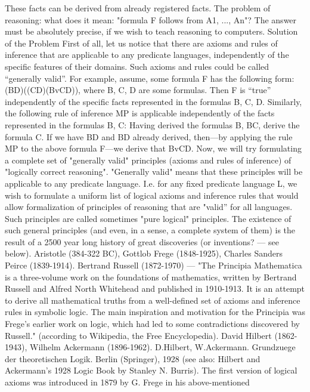 These facts can be derived from already registered facts.
The problem of reasoning: what does it mean: "formula F follows from A1, ..., An"? The answer must be
absolutely precise, if we wish to teach reasoning to computers.
Solution of the Problem
First of all, let us notice that there are axioms and rules of inference that are applicable to any predicate
languages, independently of the specific features of their domains. Such axioms and rules could be called
``generally valid''.
For example, assume, some formula F has the following form:
(B\IMPLIES D)\IMPLIES ((C\IMPLIES D)\IMPLIES (BvC\IMPLIES D)),
where B, C, D are some formulas. Then F is ``true'' independently of the specific facts represented in the
formulas B, C, D.
Similarly, the following rule of inference MP is applicable independently of the facts represented in the
formulas B, C:
Having derived the formulas B, B\IMPLIES C, derive the formula C.
If we have B\IMPLIES D and B\IMPLIES D already derived, then---by applying the rule MP to the above formula F---we
derive that BvC\IMPLIES D.
Now, we will try formulating a complete set of "generally valid" principles (axioms and rules of
inference) of "logically correct reasoning". "Generally valid" means that these principles will be
applicable to any predicate language. I.e. for any fixed predicate language L, we wish to formulate a
uniform list of logical axioms and inference rules that would allow formalization of principles of
reasoning that are "valid'' for all languages. Such principles are called sometimes "pure logical"
principles. The existence of such general principles (and even, in a sense, a complete system of them) is
the result of a 2500 year long history of great discoveries (or inventions? --- see below).
Aristotle (384-322 BC), Gottlob Frege (1848-1925), Charles Sanders Peirce (1839-1914).
Bertrand Russell (1872-1970) --- "The Principia Mathematica is a three-volume work on the foundations of mathematics,
written by Bertrand Russell and Alfred North Whitehead and published in 1910-1913. It is an attempt to derive all
mathematical truths from a well-defined set of axioms and inference rules in symbolic logic. The main inspiration and
motivation for the Principia was Frege's earlier work on logic, which had led to some contradictions discovered by Russell."
(according to Wikipedia, the Free Encyclopedia).
David Hilbert (1862-1943), Wilhelm Ackermann (1896-1962).
D.Hilbert, W.Ackermann. Grundzuege der theoretischen Logik. Berlin (Springer), 1928 (see also: Hilbert and Ackermann's
1928 Logic Book by Stanley N. Burris).
The first version of logical axioms was introduced in 1879 by G. Frege in his above-mentioned
